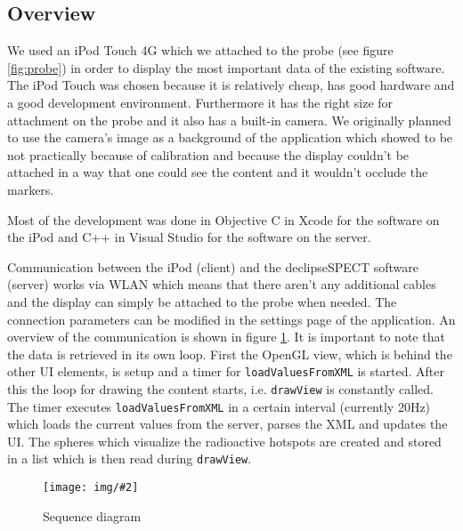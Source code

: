 \documentclass{scrartcl}
\newcommand{\red}[1]{{\color{red} #1}}
\newcommand{\graphic}[3][width=\linewidth] %
{
  \begin{figure}[h!t]
    \centering
    \texttt{[image: img/\#2]}
    \caption{#3}
    \label{fig:#2}
  \end{figure}
}
\newcommand{\refFigure}[1]{figure \ref{fig:#1}}
\begin{document}
\subsection{Overview}
We used an iPod Touch 4G which we attached to the probe (see \refFigure{probe}) in order to display the most important data of the existing software.
The iPod Touch was chosen because it is relatively cheap, has good hardware and a good development environment. Furthermore it has the right size for attachment on the probe and it also has a built-in camera. We originally planned to use the camera's image as a background of the application which showed to be not practically because of calibration and because the display couldn't be attached in a way that one could see the content and it wouldn't occlude the markers.

Most of the development was done in Objective C in Xcode for the software on the iPod and C++ in Visual Studio for the software on the server.

Communication between the iPod (client) and the declipseSPECT software (server) works via WLAN which means that there aren't any additional cables and the display can simply be attached to the probe when needed. The connection parameters can be modified in the settings page of the application.
An overview of the communication is shown in \refFigure{sequence-diagram}. It is important to note that the data is retrieved in its own loop. First the OpenGL view, which is behind the other UI elements, is setup and a timer for \verb|loadValuesFromXML| is started. After this the loop for drawing the content starts, i.e. \verb|drawView| is constantly called. The timer executes \verb|loadValuesFromXML| in a certain interval (currently 20Hz) which loads the current values from the server, parses the XML and updates the UI. The spheres which visualize the radioactive hotspots are created and stored in a list which is then read during \verb|drawView|.
\graphic[scale=.8]{sequence-diagram}{Sequence diagram}
\end{document}
